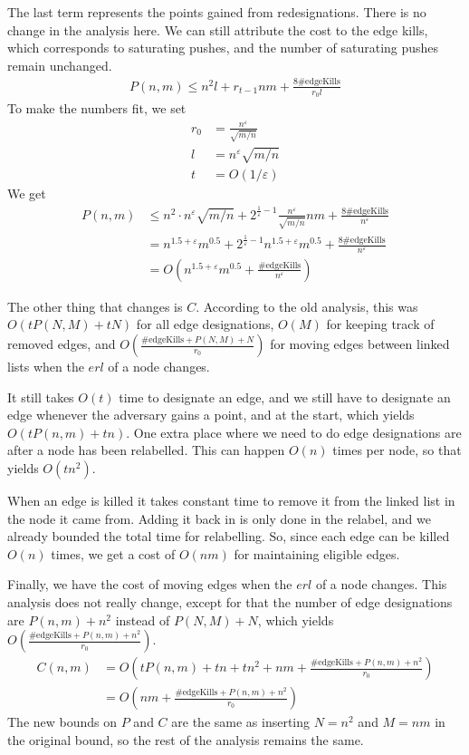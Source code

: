 The last term represents the points gained from redesignations. 
There is no change in the analysis here. We can still attribute the cost to the edge kills, which corresponds to saturating pushes, and the number of saturating pushes remain unchanged.
\begin{align*}
P(n, m) \leq n^2l + r_{t-1}nm + \frac{8\mathrm{\#edgeKills}}{r_0l}
\end{align*}
To make the numbers fit, we set
\begin{align*}
r_0 &= \frac{n^\varepsilon}{\sqrt{m/n}}\\
l &= n^\varepsilon \sqrt{m/n}\\ 
t &= O(1/\varepsilon)
\end{align*}
We get
\begin{align*}
P(n, m) &\leq n^2\cdot n^\varepsilon \sqrt{m/n} + 2^{\frac{1}{\varepsilon} - 1} \frac{n^\varepsilon}{\sqrt{m/n}}nm + \frac{8\mathrm{\#edgeKills}}{n^{\varepsilon}}\\
&=n^{1.5+\varepsilon}m^{0.5} + 2^{\frac{1}{\varepsilon} - 1} n^{1.5+\varepsilon}m^{0.5} + \frac{8\mathrm{\#edgeKills}}{n^{\varepsilon}}\\
&=O\left(n^{1.5+\varepsilon}m^{0.5} + \frac{\mathrm{\#edgeKills}}{n^{\varepsilon}}\right)
\end{align*}

The other thing that changes is $C$. According to the old analysis, this was $O(tP(N, M) + tN)$ for all edge designations, 
$O(M)$ for keeping track of removed edges, 
and $O\left(\frac{\mathrm{\#edgeKills} + P(N, M) + N}{r_0}\right)$ for moving edges between linked lists when the $erl$ of a node changes.

It still takes $O(t)$ time to designate an edge, and we still have to designate an edge whenever the adversary gains a point, and at the start, which yields $O(tP(n, m) + tn)$.
One extra place where we need to do edge designations are after a node has been relabelled. This can happen $O(n)$ times per node, so that yields $O(tn^2)$.

When an edge is killed it takes constant time to remove it from the linked list in the node it came from. 
Adding it back in is only done in the relabel, and we already bounded the total time for relabelling. 
So, since each edge can be killed $O(n)$ times, we get a cost of $O(nm)$ for maintaining eligible edges.

Finally, we have the cost of moving edges when the $erl$ of a node changes.
This analysis does not really change, except for that the number of edge designations are $P(n, m) + n^2$ instead of $P(N, M)+N$,
which yields\\$O\left(\frac{\mathrm{\#edgeKills} + P(n, m) + n^2}{r_0}\right)$.
\begin{align*}
C(n, m) &= O\left(tP(n, m) + tn + tn^2 + nm + \frac{\mathrm{\#edgeKills} + P(n, m) + n^2}{r_0}\right)\\
 &= O\left(nm + \frac{\mathrm{\#edgeKills} + P(n, m) + n^2}{r_0}\right)
\end{align*}
The new bounds on $P$ and $C$ are the same as inserting $N=n^2$ and $M=nm$ in the original bound, so the rest of the analysis remains the same.\\

